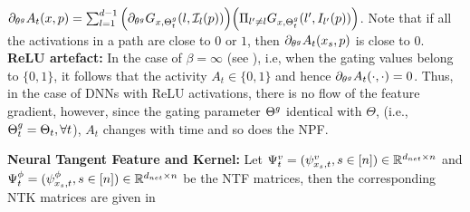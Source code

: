 $
{\partial_{\theta^g} A_{t}(x,p)}= \sum_{l=1}^{d-1} \Big({\partial_{\theta^g} G_{x,{\Theta}^g_t}(l,\mathcal{I}_l(p))} \Big)\Big(\Pi_{l'\neq l} G_{x,{\Theta}^g_t}(l',I_{l'}(p))\Big)
$.
Note that if all the activations in a path are close to $0$ or $1$, then $\partial_{\theta^g} A_t(x_s,p)$ is close to $0$.\\
\textbf{ReLU artefact:} In the case of $\beta=\infty$ (see ), i.e, when the gating values belong to $\{0,1\}$, it follows that the activity $A_t\in\{0,1\}$ and hence $\partial_{\theta^g} A_t(\cdot,\cdot)=0$. Thus, in the case of DNNs with ReLU activations, there is no flow of the feature gradient, however, since the gating parameter ${\Theta}^g$ identical with $\Theta$, (i.e., ${\Theta}^g_t=\Theta_t,\forall t$), $A_t$ changes with time and so does the NPF. \\
\begin{comment}
\begin{definition}\label{def:delta}
$\delta_t(s,s')=\sum_{p\rsa i} \ip{\varphi^a_{x_s,p,t},\varphi^a_{x_{s'},p,t}}$, for $s,s'\in[n]$, using any $i\in[d_{in}]$.
\end{definition}
\textbf{Gradient Flow via Sub-Networks:} Note that in the case of $\beta=\infty$ (see \Cref{tb:dgn}), i.e, when the gating values belong to $\{0,1\}$, it follows that the activity $A_t\in\{0,1\}$, and hence AD and FG are $0$. Thus, in the case of DNNs with ReLU activations, there is no flow of the feature gradient, however, since the gating parameter $\Tg$ identical with $\Theta$, (i.e., $\Tg_t=\Theta_t,\forall t$), $A_t$ changes with time and so does the NPF. In the case of $\beta>0$, for an input $x\in\R^{d_{in}}$, let $\N^{\S}_{x,t}(\tau_{\S})=\{p\in[P]: |\partial_{\tg} A_t(x,p)|>\tau_{\S}\}$ be the set of paths, which have activations whose gradient to any of $\Tg\inrdnet$ is greater than some threshold $\tau>0$. Note that when all the gates are close to $1$ in a path $p$, then it follows that $\partial A_t(x_s,p)$ will be very small. Thus, using the property that the slope of the sigmoid diminishes in the extremities, we can reason that for appropriate choices of $\tau_{\A}$ (sufficiently close to $1$) and $\tau_{\S}$ (large enough), $\P^{\S}(\tau_{S})\cup \P^{\A}(\tau_{\A})=\emptyset$. Thus, there are two separate networks for the two separate gradient flows, i.e., the value gradient flow via the active sub-network and the feature gradient flow via the sensitive sub-network.\\
\end{comment}
\textbf{Neural Tangent Feature and Kernel:} Let $\Psi^v_t=(\psi^v_{x_s,t},s\in[n])\in\mathbb{R}^{d_{net}\times n}$ and $\Psi^{\phi}_t=(\psi^{\phi}_{x_s,t},s\in[n])\in\mathbb{R}^{d_{net}\times n}$ be the NTF matrices, then the corresponding NTK matrices are given in 
